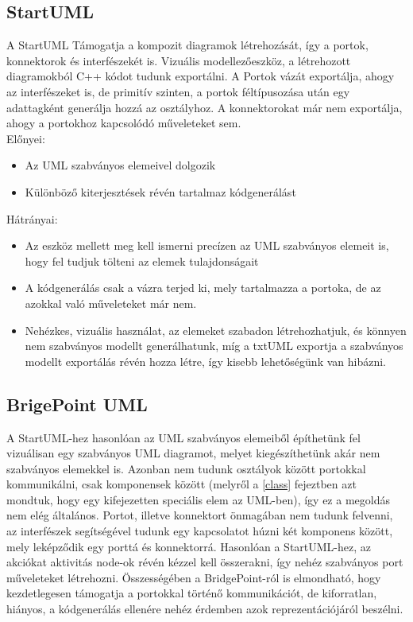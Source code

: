\documentclass[a4paper,12pt]{report}
\begin{document}
\subsection{StartUML}
A StartUML  Támogatja a kompozit diagramok létrehozását, így a portok, konnektorok és interfészekét is. Vizuális modellezőeszköz, a létrehozott diagramokból C++ kódot tudunk exportálni. A Portok vázát exportálja, ahogy az interfészeket is, de primitív szinten, a portok féltípusozása után egy adattagként generálja hozzá az osztályhoz. A konnektorokat már nem exportálja, ahogy a portokhoz kapcsolódó műveleteket sem. \\
Előnyei:
\begin{itemize}
\item Az UML szabványos elemeivel dolgozik
\item Különböző kiterjesztések révén tartalmaz kódgenerálást
\end{itemize}
Hátrányai:
\begin{itemize}
\item Az eszköz mellett meg kell ismerni precízen az UML szabványos elemeit is, hogy fel tudjuk tölteni az elemek tulajdonságait
\item A kódgenerálás csak a vázra terjed ki, mely tartalmazza a portoka, de az azokkal való műveleteket már nem.
\item Nehézkes, vizuális használat, az elemeket szabadon létrehozhatjuk, és könnyen nem szabványos modellt generálhatunk, míg a txtUML exportja a szabványos modellt exportálás révén hozza létre, így kisebb lehetőségünk van hibázni.
\end{itemize}

\subsection{BrigePoint UML}
A StartUML-hez hasonlóan az UML szabványos elemeiből építhetünk fel vizuálisan egy szabványos UML diagramot, melyet kiegészíthetünk akár nem szabványos elemekkel is. Azonban nem tudunk osztályok között portokkal kommunikálni, csak komponensek között (melyről a \ref{class} fejeztben azt mondtuk, hogy egy kifejezetten speciális elem az UML-ben), így ez a megoldás nem elég általános. Portot, illetve konnektort önmagában nem tudunk felvenni, az interfészek segítségével tudunk egy kapcsolatot húzni két komponens között, mely leképződik egy porttá és konnektorrá. Hasonlóan a StartUML-hez, az akciókat aktivitás node-ok révén kézzel kell összerakni, így nehéz szabványos port műveleteket létrehozni. Összességében a BridgePoint-ról \cite{bridge} is elmondható, hogy kezdetlegesen támogatja a portokkal történő kommunikációt, de kiforratlan, hiányos, a kódgenerálás ellenére nehéz érdemben azok reprezentációjáról beszélni. 
\end{document}
